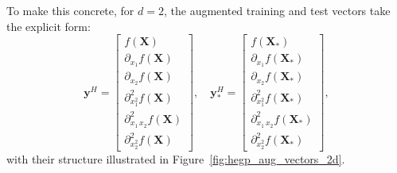 \documentclass[12pt]{article}
\begin{document}
To make this concrete, for $d = 2$, the augmented training and test vectors take the explicit form:
\begin{equation}
	\label{eqn:hegp_aug_vectors_2d}
	\mathbf{y}^{H} = \begin{bmatrix} f(\mathbf{X}) \\ \partial_{x_1} f(\mathbf{X}) \\ \partial_{x_2} f(\mathbf{X}) \\ \partial^2_{x_1^2} f(\mathbf{X}) \\ \partial^2_{x_1\,x_2} f(\mathbf{X}) \\ \partial^2_{x_2^2} f(\mathbf{X}) \end{bmatrix}, \quad
	\mathbf{y}^{H}_* = \begin{bmatrix} f(\mathbf{X}_*) \\ \partial_{x_1} f(\mathbf{X}_*) \\ \partial_{x_2} f(\mathbf{X}_*) \\ \partial^2_{x_1^2} f(\mathbf{X}_*) \\ \partial^2_{x_1\,x_2} f(\mathbf{X}_*) \\ \partial^2_{x_2^2} f(\mathbf{X}_*) \end{bmatrix},
\end{equation}
with their structure illustrated in Figure~\ref{fig:hegp_aug_vectors_2d}.
\end{document}
